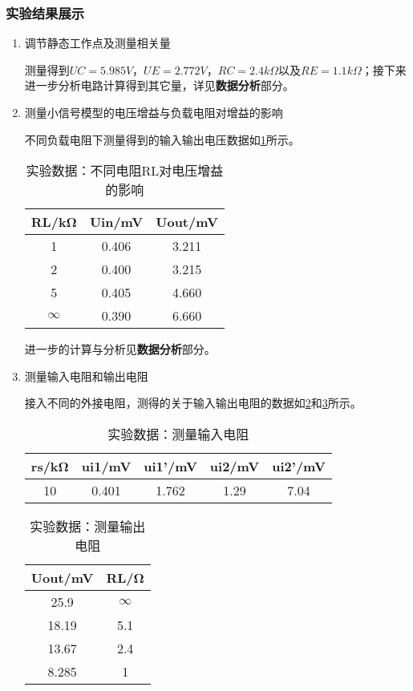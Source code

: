 \documentclass[dvipsnames, svgnames,a4paper,11pt]{article}
\begin{document}
	\subsubsection{实验结果展示}
	\begin{enumerate}
		\item 调节静态工作点及测量相关量
		
		测量得到$UC=5.985V$，$UE=2.772V$，$RC=2.4k\Omega$以及$RE=1.1k\Omega$；接下来进一步分析电路计算得到其它量，详见\textbf{数据分析}部分。		
		
		\item 测量小信号模型的电压增益与负载电阻对增益的影响
		
		不同负载电阻下测量得到的输入输出电压数据如\cref{tab:tab1}所示。
		
		\begin{table}[h]
			\centering
			\caption{实验数据：不同电阻RL对电压增益的影响}
			\label{tab:tab1}
			\begin{tabular}{|c|c|c|}
				\hline
				RL/kΩ & Uin/mV & Uout/mV \\
				\hline
				1 & 0.406 & 3.211 \\
				2 & 0.400 & 3.215 \\
				5 & 0.405 & 4.660 \\
				$\infty$ & 0.390 & 6.660 \\
				\hline
			\end{tabular}
		\end{table}		
		
		进一步的计算与分析见\textbf{\textbf{数据分析}}部分。
		
		\item 测量输入电阻和输出电阻
		
		接入不同的外接电阻，测得的关于输入输出电阻的数据如\cref{tab:tab2}和\cref{tab:tab3}所示。
		
		\begin{table}[h]
			\centering
			\caption{实验数据：测量输入电阻}
			\label{tab:tab2}
			\begin{tabular}{|c|c|c|c|c|}
				\hline
				rs/kΩ & ui1/mV & ui1'/mV & ui2/mV & ui2'/mV \\
				\hline
				10 & 0.401 & 1.762 & 1.29 & 7.04 \\
				\hline
			\end{tabular}
		\end{table}
		
		\begin{table}[h]
			\centering
			\caption{实验数据：测量输出电阻}
			\label{tab:tab3}
			\begin{tabular}{|c|c|}
				\hline
				Uout/mV & RL/Ω \\
				\hline
				25.9 & $\infty$ \\
				18.19 & 5.1 \\
				13.67 & 2.4 \\
				8.285 & 1 \\
				\hline
			\end{tabular}
		\end{table}		
		

\end{enumerate}
\end{document}
